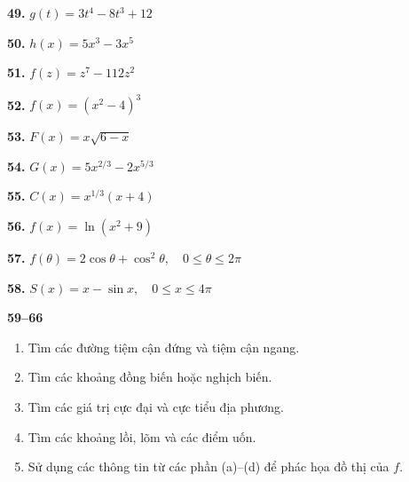 \begin{minipage}[t]{0.485\textwidth}
\vspace{0.25em}
\begin{minipage}[t]{0.48\linewidth}
  \textbf{49.} $g(t) = 3t^4 - 8t^3 + 12$
\end{minipage}\hfill
\begin{minipage}[t]{0.50\linewidth}
  \textbf{50.} $h(x) = 5x^3 - 3x^5$
\end{minipage}

\vspace{0.25em}
\begin{minipage}[t]{0.48\linewidth}
  \textbf{51.} $f(z) = z^7 - 112z^2$
\end{minipage}\hfill
\begin{minipage}[t]{0.50\linewidth}
  \textbf{52.} $f(x) = (x^2 - 4)^3$
\end{minipage}

\vspace{0.25em}
\begin{minipage}[t]{0.48\linewidth}
  \textbf{53.} $F(x) = x\sqrt{6 - x}$
\end{minipage}\hfill
\begin{minipage}[t]{0.50\linewidth}
  \textbf{54.} $G(x) = 5x^{2/3} - 2x^{5/3}$
\end{minipage}

\vspace{0.25em}
\begin{minipage}[t]{0.48\linewidth}
  \textbf{55.} $C(x) = x^{1/3}(x + 4)$
\end{minipage}\hfill
\begin{minipage}[t]{0.50\linewidth}
  \textbf{56.} $f(x) = \ln(x^2 + 9)$
\end{minipage}

\vspace{0.25em}
\noindent\textbf{57.} $f(\theta) = 2\cos\theta + \cos^2\theta, \quad 0 \le \theta \le 2\pi$

\vspace{0.25em}
\noindent\textbf{58.} $S(x) = x - \sin x, \quad 0 \le x \le 4\pi$

\exerciseline

{\color{stewartblue}\textbf{59--66}}
\begin{enumerate}[label=(\alph*), itemsep=0.5pt, topsep=1.5pt, parsep=0pt, leftmargin=1.4em]
  \item Tìm các đường tiệm cận đứng và tiệm cận ngang.
  \item Tìm các khoảng đồng biến hoặc nghịch biến.
  \item Tìm các giá trị cực đại và cực tiểu địa phương.
  \item Tìm các khoảng lồi, lõm và các điểm uốn.
  \item Sử dụng các thông tin từ các phần (a)–(d) để phác họa đồ thị của $f$.
\end{enumerate}


\end{minipage}
